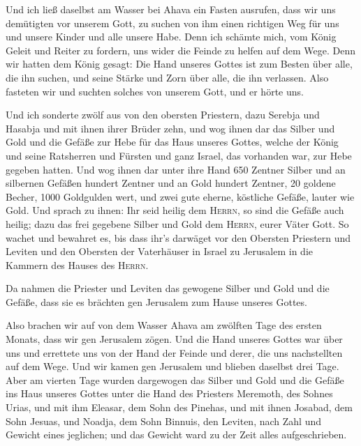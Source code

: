 Und ich ließ daselbst am Wasser bei Ahava ein Fasten
ausrufen, dass wir uns demütigten vor unserem Gott, zu suchen von ihm
einen richtigen Weg für uns und unsere Kinder und alle unsere Habe.
 Denn ich schämte mich, vom König Geleit und Reiter zu
fordern, uns wider die Feinde zu helfen auf dem Wege. Denn wir hatten
dem König gesagt: Die Hand unseres Gottes ist zum Besten über alle, die
ihn suchen, und seine Stärke und Zorn über alle, die ihn verlassen.
 Also fasteten wir und suchten solches von unserem Gott,
und er hörte uns.

 Und ich sonderte zwölf aus von den obersten Priestern,
dazu Serebja und Hasabja und mit ihnen ihrer Brüder zehn,
 und wog ihnen dar das Silber und Gold und die Gefäße zur
Hebe für das Haus unseres Gottes, welche der König und seine Ratsherren
und Fürsten und ganz Israel, das vorhanden war, zur Hebe gegeben hatten.
 Und wog ihnen dar unter ihre Hand 650 Zentner Silber und
an silbernen Gefäßen hundert Zentner und an Gold hundert Zentner,
 20 goldene Becher, 1000 Goldgulden wert, und zwei gute
eherne, köstliche Gefäße, lauter wie Gold.  Und sprach zu
ihnen: Ihr seid heilig dem \textsc{Herrn}, so sind die Gefäße auch
heilig; dazu das frei gegebene Silber und Gold dem \textsc{Herrn}, eurer
Väter Gott.  So wachet und bewahret es, bis dass ihr's
darwäget vor den Obersten Priestern und Leviten und den Obersten der
Vaterhäuser in Israel zu Jerusalem in die Kammern des Hauses des
\textsc{Herrn}.

 Da nahmen die Priester und Leviten das gewogene Silber
und Gold und die Gefäße, dass sie es brächten gen Jerusalem zum Hause
unseres Gottes.

 Also brachen wir auf von dem Wasser Ahava am zwölften
Tage des ersten Monats, dass wir gen Jerusalem zögen. Und die Hand
unseres Gottes war über uns und errettete uns von der Hand der Feinde
und derer, die uns nachstellten auf dem Wege.  Und wir
kamen gen Jerusalem und blieben daselbst drei Tage.  Aber
am vierten Tage wurden dargewogen das Silber und Gold und die Gefäße ins
Haus unseres Gottes unter die Hand des Priesters Meremoth, des Sohnes
Urias, und mit ihm Eleasar, dem Sohn des Pinehas, und mit ihnen Josabad,
dem Sohn Jesuas, und Noadja, dem Sohn Binnuis, den Leviten,
 nach Zahl und Gewicht eines jeglichen; und das Gewicht
ward zu der Zeit alles aufgeschrieben.

